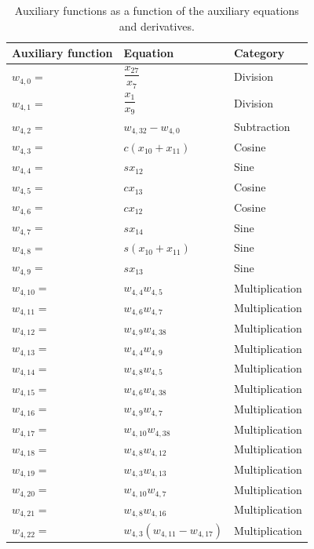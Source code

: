 \begin{longtable}{|p{1.5cm}|l|p{2cm}|}
\caption{Auxiliary functions as a function of the auxiliary equations and derivatives.}
\label{tab:auxFunc}
\endfirsthead
\endhead
\hline
\textbf{Auxiliary function} & \textbf{Equation} & \textbf{Category}  \\ \hline \hline
\hline 
$w_{4,0}=$  & $ \dfrac{x_{27}}{x_{7}} $ & Division \\ \hline
$w_{4,1}=$  & $ \dfrac{x_{1}}{x_{9}} $ & Division \\ \hline
$w_{4,2}=$  & $ w_{4,32}-w_{4,0} $ & Subtraction \\ \hline
$w_{4,3}=$  & $ c\left(x_{10}+x_{11}\right) $ & Cosine  \\ \hline
$w_{4,4}=$  & $ sx_{12} $ & Sine \\ \hline
$w_{4,5}=$  & $ cx_{13} $ & Cosine  \\ \hline
$w_{4,6}=$  & $ cx_{12} $ & Cosine \\ \hline
$w_{4,7}=$  & $ sx_{14} $ & Sine \\ \hline
$w_{4,8}=$  & $ s\left(x_{10}+x_{11}\right) $ & Sine \\ \hline
$w_{4,9}=$ & $ sx_{13} $ & Sine \\ \hline
$w_{4,10}=$ & $ w_{4,4}w_{4,5} $ & Multiplication  \\ \hline
$w_{4,11}=$ & $ w_{4,6}w_{4,7} $ &  Multiplication \\ \hline
$w_{4,12}=$ & $ w_{4,9}w_{4,38} $ & Multiplication  \\ \hline
$w_{4,13}=$ & $ w_{4,4}w_{4,9} $ &  Multiplication \\ \hline
$w_{4,14}=$ & $ w_{4,8}w_{4,5} $ & Multiplication \\ \hline
$w_{4,15}=$ & $ w_{4,6}w_{4,38} $ &  Multiplication \\ \hline
$w_{4,16}=$ & $ w_{4,9}w_{4,7} $ & Multiplication  \\ \hline
$w_{4,17}=$ & $ w_{4,10}w_{4,38} $ & Multiplication \\ \hline
$w_{4,18}=$ & $ w_{4,8}w_{4,12} $ & Multiplication  \\ \hline
$w_{4,19}=$ & $ w_{4,3}w_{4,13} $ &  Multiplication \\ \hline
$w_{4,20}=$ & $ w_{4,10}w_{4,7} $ &  Multiplication \\ \hline
$w_{4,21}=$ & $ w_{4,8}w_{4,16} $ &  Multiplication \\ \hline
$w_{4,22}=$ & $ w_{4,3}\left(w_{4,11}-w_{4,17}\right) $ & Multiplication  \\ \hline

\end{longtable}
